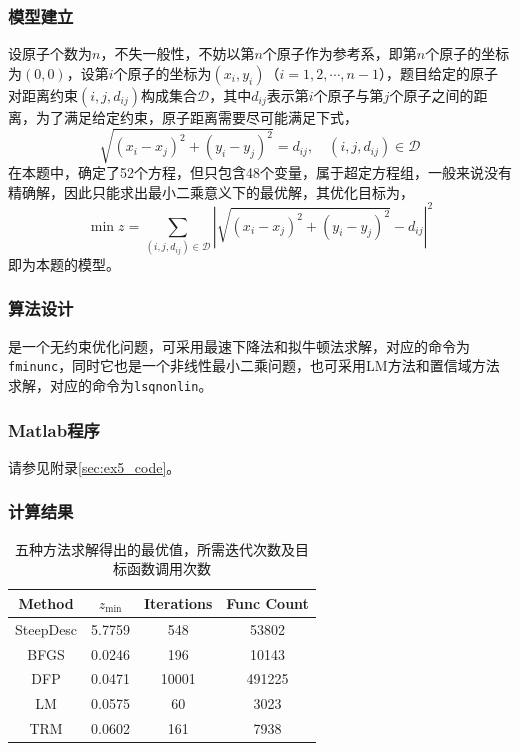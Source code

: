 \documentclass[12pt,a4paper]{article}
\begin{document}
\subsubsection{模型建立}

设原子个数为$n$，不失一般性，不妨以第$n$个原子作为参考系，即第$n$个原子的坐标为$(0,0)$，设第$i$个原子的坐标为$(x_i, y_i)$（$i = 1,2,\cdots,n-1$），题目给定的原子对距离约束$(i, j, d_{ij})$构成集合$\mathcal{D}$，其中$d_{ij}$表示第$i$个原子与第$j$个原子之间的距离，为了满足给定约束，原子距离需要尽可能满足下式，
\begin{equation}\label{eq:ex5_equal}
    \sqrt{(x_i-x_j)^2 + (y_i-y_j)^2} = d_{ij}, \quad (i,j,d_{ij}) \in \mathcal{D}
\end{equation}
在本题中，确定了52个方程，但只包含48个变量，属于超定方程组，一般来说没有精确解，因此只能求出最小二乘意义下的最优解，其优化目标为，
\begin{equation}\label{eq:ex5_model}
    \min z = \sum_{(i,j,d_{ij}) \in \mathcal{D}} \left|\sqrt{(x_i-x_j)^2 + (y_i-y_j)^2} - d_{ij}\right|^2
\end{equation}
即为本题的模型。

\subsubsection{算法设计}

是一个无约束优化问题，可采用最速下降法和拟牛顿法求解，对应的命令为\texttt{fminunc}，同时它也是一个非线性最小二乘问题，也可采用LM方法和置信域方法求解，对应的命令为\texttt{lsqnonlin}。

\subsubsection{Matlab程序}

请参见附录\ref{sec:ex5_code}。

\subsubsection{计算结果}

\begin{table}[t]
    \centering
    \caption{五种方法求解得出的最优值，所需迭代次数及目标函数调用次数}
    \label{tab:ex5_result}
    \begin{tabular}{c|ccc}
        \toprule
        Method & $z_{\min}$& Iterations & Func Count\tabularnewline
        \midrule
        SteepDesc & 5.7759 & 548 & 53802\tabularnewline
        BFGS & 0.0246 & 196 & 10143\tabularnewline
        DFP & 0.0471 & 10001 & 491225\tabularnewline
        LM & 0.0575 & 60 & 3023\tabularnewline
        TRM & 0.0602 & 161 & 7938\tabularnewline
        \bottomrule
    \end{tabular}
\end{table}
\end{document}
